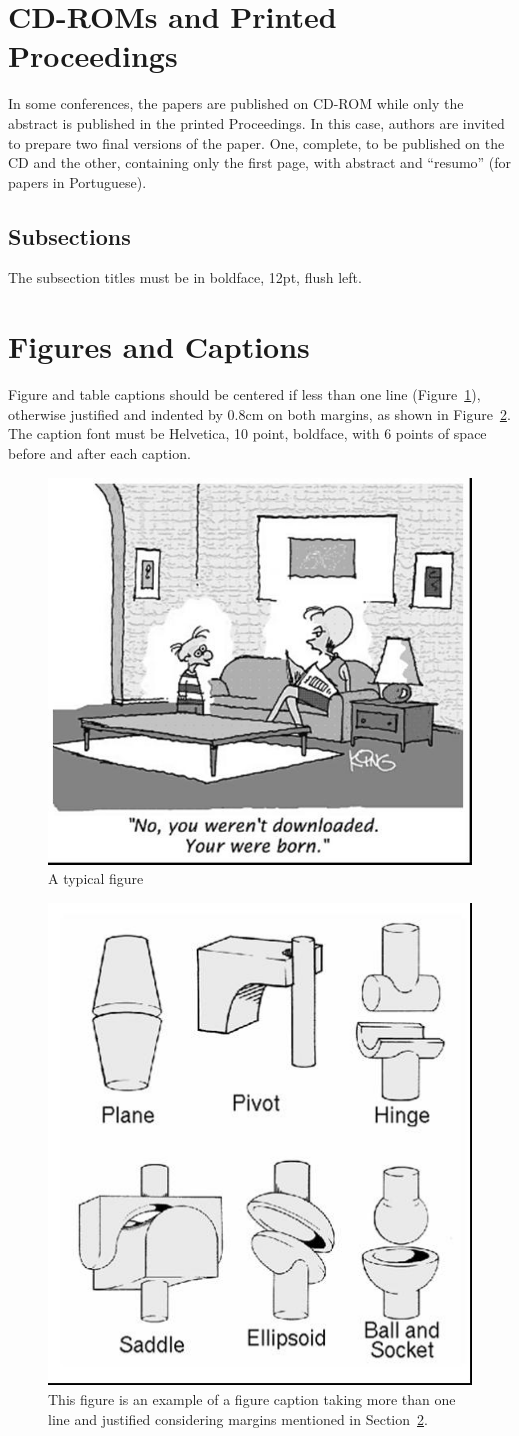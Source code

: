 \documentclass[12pt]{article}
\begin{document}
\section{CD-ROMs and Printed Proceedings}

In some conferences, the papers are published on CD-ROM while only the
abstract is published in the printed Proceedings. In this case, authors are
invited to prepare two final versions of the paper. One, complete, to be
published on the CD and the other, containing only the first page, with
abstract and ``resumo'' (for papers in Portuguese).

\subsection{Subsections}

The subsection titles must be in boldface, 12pt, flush left.

\section{Figures and Captions}\label{sec:figs}


Figure and table captions should be centered if less than one line
(Figure~\ref{fig:exampleFig1}), otherwise justified and indented by 0.8cm on
both margins, as shown in Figure~\ref{fig:exampleFig2}. The caption font must
be Helvetica, 10 point, boldface, with 6 points of space before and after each
caption.

\begin{figure}[ht]
\centering
\includegraphics[width=.5\textwidth]{fig1.jpg}
\caption{A typical figure}
\label{fig:exampleFig1}
\end{figure}

\begin{figure}[ht]
\centering
\includegraphics[width=.3\textwidth]{fig2.jpg}
\caption{This figure is an example of a figure caption taking more than one
  line and justified considering margins mentioned in Section~\ref{sec:figs}.}
\label{fig:exampleFig2}
\end{figure}
\end{document}
